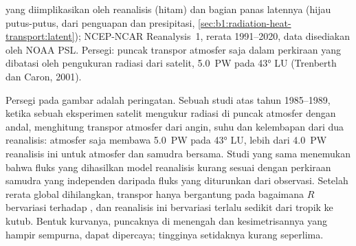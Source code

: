 \begin{omfigure}

{\small {} yang diimplikasikan oleh  reanalisis (hitam) dan bagian panas latennya (hijau putus-putus, dari penguapan dan presipitasi, \cref{sec:b1:radiation-heat-transport:latent}); NCEP-NCAR Reanalysis~1, rerata 1991--2020, data disediakan oleh NOAA PSL. Persegi: puncak transpor atmosfer saja dalam perkiraan yang dibatasi oleh pengukuran radiasi dari satelit, \qty{5.0}{PW} pada \ang{43} LU (Trenberth dan Caron, 2001).}
\label{fig:b1:radiation-heat-transport:transport}
\end{omfigure}

Persegi pada gambar adalah peringatan. Sebuah studi atas tahun 1985--1989, ketika sebuah eksperimen satelit mengukur radiasi di puncak atmosfer dengan andal, menghitung transpor atmosfer dari angin, suhu dan kelembapan dari dua reanalisis: atmosfer saja membawa \qty{5.0}{PW} pada \ang{43} LU, lebih dari \qty{4.0}{PW} reanalisis ini untuk atmosfer dan samudra bersama. Studi yang sama menemukan bahwa fluks yang dihasilkan model reanalisis kurang sesuai dengan perkiraan samudra yang independen daripada fluks yang diturunkan dari observasi. Setelah rerata global dihilangkan, transpor hanya bergantung pada bagaimana $R$ bervariasi terhadap , dan  reanalisis ini bervariasi terlalu sedikit dari tropik ke kutub. Bentuk kurvanya, puncaknya di  menengah dan kesimetrisannya yang hampir sempurna, dapat dipercaya; tingginya setidaknya kurang seperlima.

